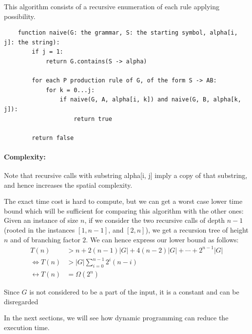 \documentclass[twocolumn]{article}
\begin{document}
This algorithm consists of a recursive enumeration of each rule applying possibility.

\begin{lstlisting}
    function naive(G: the grammar, S: the starting symbol, alpha[i, j]: the string):
        if j = 1:
            return G.contains(S -> alpha)

        for each P production rule of G, of the form S -> AB:
            for k = 0...j:
                if naive(G, A, alpha[i, k]) and naive(G, B, alpha[k, j]):
                    return true

        return false
\end{lstlisting}

\paragraph{Complexity:}
Note that recursive calls with substring alpha[i, j] imply a copy of that
substring, and hence increases the spatial complexity.

The exact time cost is hard to compute, but we can get a worst case lower time bound which
will be sufficient for comparing this algorithm with the other ones:\\
Given an instance of size $n$, if we consider the two recursive calls of depth
$n-1$ (rooted in the instances $[1, n-1]$, and $[2, n]$), we get a recursion tree of height $n$ and of branching factor $2$. We can
hence express our lower bound as follows:\\
\begin{align*}
  T(n) &> n+2(n-1)|G|+4(n-2)|G|+\cdots +2^{n-1}|G|\\
  \Leftrightarrow T(n) &>|G|\displaystyle\sum_{i=0}^{n-1}2^i(n-i)\\
  \leftrightarrow T(n) &=\Omega(2^n)
\end{align*}

Since $G$ is not considered to be a part of the input, it is a constant and can
be disregarded

In the next sections, we will see how dynamic programming can reduce the execution time.
\end{document}
